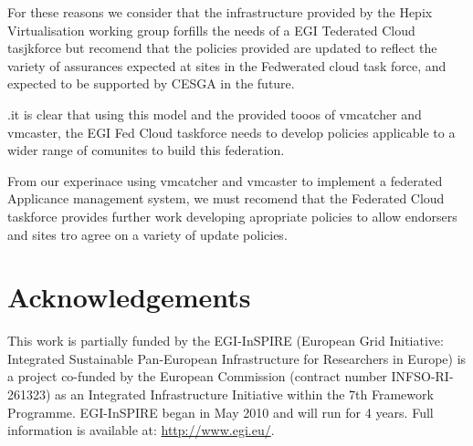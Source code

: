 \documentclass{llncs_Ibergrid2013}
\begin{document}
For these reasons we consider that the infrastructure provided by the Hepix Virtualisation working group forfills the needs of a EGI Tederated Cloud tasjkforce but recomend that the policies provided are updated to reflect the variety of assurances expected at sites in the Fedwerated cloud task force, and expected to be supported by CESGA in the future.

.it is clear that using this model and the provided tooos of vmcatcher and vmcaster, the EGI Fed Cloud taskforce needs to develop policies applicable to a wider range of comunites to build this federation.

From our experinace using vmcatcher and vmcaster to implement a federated Applicance management system, we must recomend that the Federated Cloud taskforce provides further work developing apropriate policies to allow endorsers and sites tro agree on a variety of update policies. 
\section*{Acknowledgements}
\label{sect-acknowledgements}
This work is partially funded by the  EGI-InSPIRE (European Grid Initiative: Integrated Sustainable
Pan-European Infrastructure for Researchers in Europe) is a project co-funded by the European Commission 
(contract number INFSO-RI-261323) as an Integrated Infrastructure Initiative within the 7th Framework 
Programme. EGI-InSPIRE began in May 2010 and will run for 4 years. Full information is available at:
\url{http://www.egi.eu/}.

%
%
%


%






\end{document}
